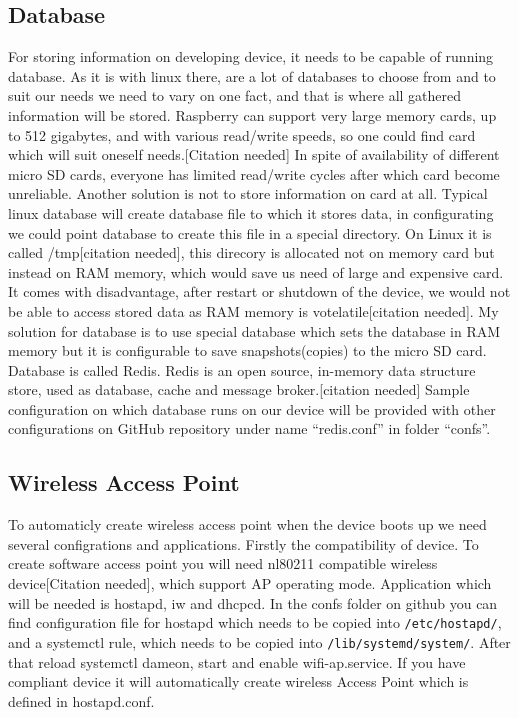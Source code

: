 \subsection{Database} %
\label{sub:database}
For storing information on developing device, it needs to be capable of running database. As it is with linux there, are a lot of databases to choose from and to suit our needs we need to vary on one fact, and that is where all gathered information will be stored. Raspberry can support very large memory cards, up to 512 gigabytes, and with various read/write speeds, so one could find card which will suit oneself needs.[Citation needed] In spite of availability of different micro SD cards, everyone has limited read/write cycles after which card become unreliable. Another solution is not to store information on card at all. Typical linux database will create database file to which it stores data, in configurating we could point database to create this file in a special directory. On Linux it is called /tmp[citation needed], this direcory is allocated not on memory card but instead on RAM memory, which would save us need of large and expensive card. It comes with disadvantage, after restart or shutdown of the device, we would not be able to access stored data as RAM memory is votelatile[citation needed].
My solution for database is to use special database which sets the database in RAM memory but it is configurable to save snapshots(copies) to the micro SD card. Database is called Redis. Redis is an open source, in-memory data structure store, used as database, cache and message broker.[citation needed] Sample configuration on which database runs on our device will be provided with other configurations on GitHub repository under name ``redis.conf'' in folder ``confs''.
\subsection{Wireless Access Point} %
\label{sub:wireless_access_point}
To automaticly create wireless access point when the device boots up we need several configrations and applications. Firstly the compatibility of device. To create software access point you will need nl80211 compatible wireless device[Citation needed], which support AP operating mode. Application which will be needed is hostapd, iw and dhcpcd. In the confs folder on github you can find configuration file for hostapd which needs to be copied into \verb|/etc/hostapd/|, and a systemctl rule, which needs to be copied into \verb|/lib/systemd/system/|. After that reload systemctl dameon, start and enable wifi-ap.service. If you have compliant device it will automatically create wireless Access Point which is defined in hostapd.conf.
